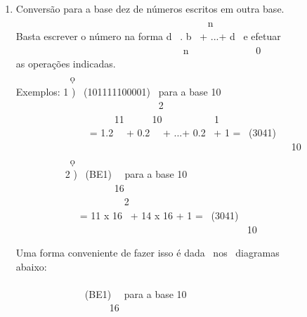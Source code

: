 \documentclass[a4paper,12pt]{article}
\begin{document}
\begin{enumerate}[label=\alph*), align=left, leftmargin=1.5em, labelsep=-0.5em, itemsep=1em, topsep=1.5em]
\item Conversão para a base dez de números escritos em outra base.\\[-0.5em]
\phantom \ \ \ \ \ \ \ \ \ \ \ \ \ \ \ \ \ \ \ \ \ \ \ \ \ \ \ \ \ \ \ \ \ \ \ \ \ \ \ n\\[-1em]
Basta escrever o número na forma d \ . b \ + ...+ d \ e efetuar\\[-1em]
\phantom \ \ \ \ \ \ \ \ \ \ \ \ \ \ \ \ \ \ \ \ \ \ \ \ \ \ \ \ \ \ \ \ \ \ n \ \ \ \ \ \ \ \ \ \ \ \ \ 0\\[-0.5em]
as operações indicadas.\\[0.5em]
\phantom \ \ \ \ \ \ \ \ \ \ \ \d{o}\\[-1.2em]
Exemplos: 1 ) \ (101111100001) \ para a base 10\\[-1em]
\phantom \ \ \ \ \ \ \ \ \ \ \ \ \ \ \ \ \ \ \ \ \ \ \ \ \ \ \ \ \ 2\\[-0.5em]
\phantom \ \ \ \ \ \ \ \ \ \ \ \ \ \ \ \ \ \ \ \ 11 \ \ \ \ \ 10 \ \ \ \ \ \ \ \ \ \ 1\\[-1em]
\phantom \ \ \ \ \ \ \ \ \ \ \ \ \ \ \ = 1.2 \ \ + 0.2 \ \ + ...+ 0.2 \ + 1 = \ (3041)\\[-1em]
\phantom \ \ \ \ \ \ \ \ \ \ \ \ \ \ \ \ \ \ \ \ \ \ \ \ \ \ \ \ \ \ \ \ \ \ \ \ \ \ \ \ \ \ \ \ \ \ \ \ \ \ \ \ \ \ \ \ 10\\[1em]
\phantom \ \ \ \ \ \ \ \ \ \ \ \d{o}\\[-1.2em]
\phantom \ \ \ \ \ \ \ \ \ \ 2 ) \ (BE1) \ \ para a base 10\\[-1em]
\phantom \ \ \ \ \ \ \ \ \ \ \ \ \ \ \ \ \ \ \ \ 16\\
\phantom \ \ \ \ \ \ \ \ \ \ \ \ \ \ \ \ \ \ \ \ \ \ 2\\[-1em]
\phantom \ \ \ \ \ \ \ \ \ \ \ \ \ = 11 x 16 \ + 14 x 16 + 1 = \ (3041)\\[-1em]
\phantom \ \ \ \ \ \ \ \ \ \ \ \ \ \ \ \ \ \ \ \ \ \ \ \ \ \ \ \ \ \ \ \ \ \ \ \ \ \ \ \ \ \ \ \ \ \ \ 10\\[1em]

\newpage

\noindent Uma forma conveniente de fazer isso é dada \ nos \ diagramas \\
abaixo:\\\\[-1em]
\phantom \ \ \ \ \ \ \ \ \ \ \ \ \ \ (BE1) \ \ para a base 10\\[-1em]
\phantom \ \ \ \ \ \ \ \ \ \ \ \ \ \ \ \ \ \ \ 16\\[-0.5em]


\end{enumerate}
\end{document}
